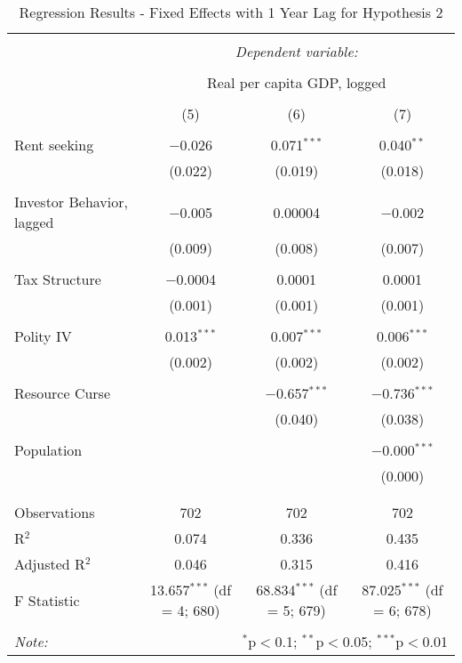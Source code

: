 \documentclass[12pt]{report}   	%
\begin{document}
\begin{table}[h] \centering 
  \caption{Regression Results - Fixed Effects with 1 Year Lag for Hypothesis 2} 
  \label{} 
\begin{tabular}{@{\extracolsep{5pt}}lccc} 
\\[-1.8ex]\hline 
\hline \\[-1.8ex] 
 & \multicolumn{3}{c}{\textit{Dependent variable:}} \\ 
\cline{2-4} 
\\[-1.8ex] & \multicolumn{3}{c}{Real per capita GDP, logged} \\ 
\\[-1.8ex] & (5) & (6) & (7)\\ 
\hline \\[-1.8ex] 
 Rent seeking & $-$0.026 & 0.071$^{***}$ & 0.040$^{**}$ \\ 
  & (0.022) & (0.019) & (0.018) \\ 
  & & & \\ 
 Investor Behavior, lagged & $-$0.005 & 0.00004 & $-$0.002 \\ 
  & (0.009) & (0.008) & (0.007) \\ 
  & & & \\ 
 Tax Structure & $-$0.0004 & 0.0001 & 0.0001 \\ 
  & (0.001) & (0.001) & (0.001) \\ 
  & & & \\ 
 Polity IV & 0.013$^{***}$ & 0.007$^{***}$ & 0.006$^{***}$ \\ 
  & (0.002) & (0.002) & (0.002) \\ 
  & & & \\ 
 Resource Curse &  & $-$0.657$^{***}$ & $-$0.736$^{***}$ \\ 
  &  & (0.040) & (0.038) \\ 
  & & & \\ 
 Population &  &  & $-$0.000$^{***}$ \\ 
  &  &  & (0.000) \\ 
  & & & \\ 
\hline \\[-1.8ex] 
Observations & 702 & 702 & 702 \\ 
R$^{2}$ & 0.074 & 0.336 & 0.435 \\ 
Adjusted R$^{2}$ & 0.046 & 0.315 & 0.416 \\ 
F Statistic & 13.657$^{***}$ (df = 4; 680) & 68.834$^{***}$ (df = 5; 679) & 87.025$^{***}$ (df = 6; 678) \\ 
\hline 
\hline \\[-1.8ex] 
\textit{Note:}  & \multicolumn{3}{r}{$^{*}$p$<$0.1; $^{**}$p$<$0.05; $^{***}$p$<$0.01} \\ 
\end{tabular} 
\end{table} 
\end{document}
